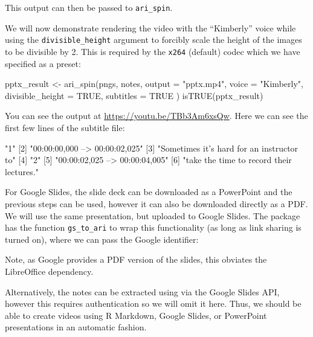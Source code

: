 This output can then be passed to \texttt{ari\_spin}.

We will now demonstrate rendering the video with the ``Kimberly'' voice
while using the \texttt{divisible\_height} argument to forcibly scale
the height of the images to be divisible by 2. This is required by the
\texttt{x264} (default) codec which we have specified as a preset:

\begin{example}
pptx_result <- ari_spin(pngs, notes,
  output = "pptx.mp4", voice = "Kimberly",
  divisible_height = TRUE, subtitles = TRUE
)
isTRUE(pptx_result)
\end{example}

You can see the output at \url{https://youtu.be/TBb3Am6xsQw}. Here we
can see the first few lines of the subtitle file:

\begin{example}
[1] "1"                                       
[2] "00:00:00,000 --> 00:00:02,025"           
[3] "Sometimes it’s hard for an instructor to"
[4] "2"                                       
[5] "00:00:02,025 --> 00:00:04,005"           
[6] "take the time to record their lectures." 
\end{example}

For Google Slides, the slide deck can be downloaded as a PowerPoint and
the previous steps can be used, however it can also be downloaded
directly as a PDF. We will use the same presentation, but uploaded to
Google Slides. The  package has the function
\texttt{gs\_to\_ari} to wrap this functionality (as long as link sharing
is turned on), where we can pass the Google identifier:


Note, as Google provides a PDF version of the slides, this obviates the
LibreOffice dependency.

Alternatively, the notes can be extracted using  via
the Google Slides API, however this requires authentication so we will
omit it here. Thus, we should be able to create videos using R Markdown,
Google Slides, or PowerPoint presentations in an automatic fashion.

